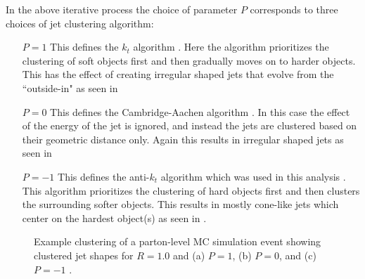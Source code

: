 In the above iterative process the choice of parameter $P$ corresponds to three
choices of jet clustering algorithm:

\begin{enumerate}

  \item[$P = 1$] This defines the $k_{t}$ algorithm \cite{Catani:1993hr}.  Here the algorithm prioritizes the clustering of soft objects first and then gradually moves on to harder objects.  This has the effect of creating irregular shaped jets that evolve from the ``outside-in" as seen in 
  \item[$P = 0$] This defines the Cambridge-Aachen algorithm \cite{Dokshitzer:1997in}.  In this case the effect of the energy of the jet is ignored, and instead the jets are clustered based on their geometric distance only.  Again this results in irregular shaped jets as seen in 
  \item[$P = -1$] This defines the anti-$k_{t}$ algorithm which was used in this analysis \cite{Cacciari:2008gp}.  This algorithm prioritizes the clustering of hard objects first and then clusters the surrounding softer objects.  This results in mostly cone-like jets which center on the hardest object(s) as seen in .
\end{enumerate}

\begin{figure}[!htbp]
  \centering
  \caption{Example clustering of a parton-level MC simulation event showing
clustered jet shapes for $R=1.0$ and (a) $P=1$, (b) $P=0$, and (c) $P=-1$
\cite{Cacciari:2008gp}.}
  \label{fig:clustering_algorithms}
\end{figure}

